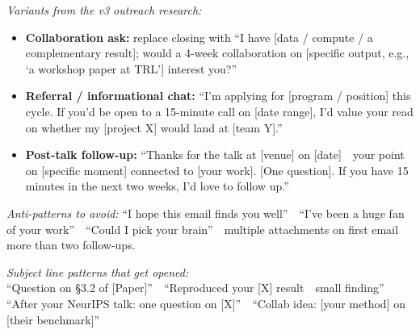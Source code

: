 \documentclass[11pt,letterpaper]{article}
\newcommand{\bdash}{\,\textemdash\,}
\begin{document}
{\sffamily\footnotesize\color{meta}%
\textit{Variants from the v3 outreach research:}%
\begin{itemize}
\item \textbf{Collaboration ask:} replace closing with ``I have [data / compute / a complementary result]; would a 4-week collaboration on [specific output, e.g., `a workshop paper at TRL'] interest you?''
\item \textbf{Referral / informational chat:} ``I'm applying for [program / position] this cycle. If you'd be open to a 15-minute call on [date range], I'd value your read on whether my [project X] would land at [team Y].''
\item \textbf{Post-talk follow-up:} ``Thanks for the talk at [venue] on [date] \bdash{} your point on [specific moment] connected to [your work]. [One question]. If you have 15 minutes in the next two weeks, I'd love to follow up.''
\end{itemize}

\textit{Anti-patterns to avoid:} ``I hope this email finds you well'' \bdash{} ``I've been a huge fan of your work'' \bdash{} ``Could I pick your brain'' \bdash{} multiple attachments on first email \bdash{} more than two follow-ups.

\textit{Subject line patterns that get opened:}\\
``Question on \S3.2 of [Paper]'' \bdash{}
``Reproduced your [X] result \bdash{} small finding'' \bdash{}
``After your NeurIPS talk: one question on [X]'' \bdash{}
``Collab idea: [your method] on [their benchmark]''
}

\bdash{}

\renewcommand{\bdash}{\,\textemdash\,}
\end{document}
